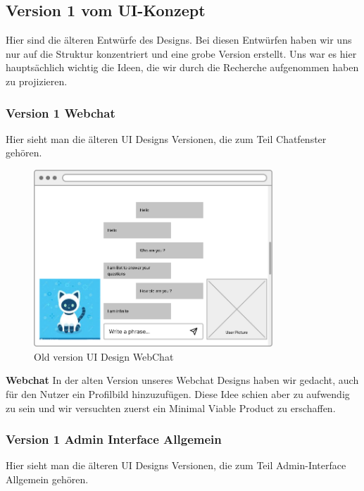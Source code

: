 \subsection{Version 1 vom UI-Konzept}

Hier sind die älteren Entwürfe des Designs. Bei diesen Entwürfen haben wir uns nur auf die Struktur
konzentriert und eine grobe Version erstellt. Uns war es hier hauptsächlich wichtig
die Ideen, die wir durch die Recherche aufgenommen haben zu projizieren.
\\
\newpage
\subsubsection{Version 1 Webchat}
Hier sieht man die älteren UI Designs Versionen, die zum Teil Chatfenster gehören.

\begin{figure}[H]
    \centering
    \includegraphics[width=0.8\textwidth]{bilder/old vers. UI Design/WebChat.png}
    \caption{Old version UI Design WebChat}
    \label{fig:Old version UI Design WebChat}
    \end{figure}
\noindent \textbf{Webchat} \newline
In der alten Version unseres Webchat Designs haben wir gedacht, auch für den
Nutzer ein Profilbild hinzuzufügen. Diese Idee schien aber zu aufwendig zu sein und wir versuchten
zuerst ein Minimal Viable Product zu erschaffen.                                                     

\newpage

\subsubsection{Version 1 Admin Interface Allgemein}
Hier sieht man die älteren UI Designs Versionen, die zum Teil Admin-Interface Allgemein gehören.

